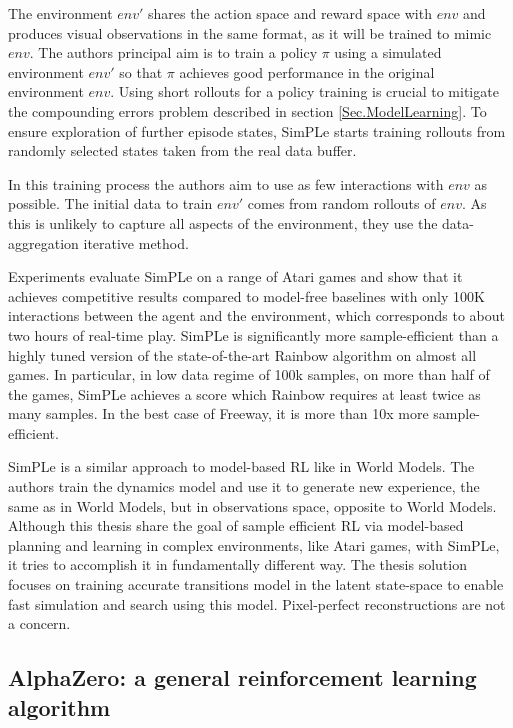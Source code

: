 The environment $env'$ shares the action space and reward space with $env$ and produces visual observations in the same format, as it will be trained to mimic $env$. The authors principal aim is to train a policy $\pi$ using a simulated environment $env'$ so that $\pi$ achieves good performance in the original environment $env$. Using short rollouts for a policy training is crucial to mitigate the compounding errors problem described in section \ref{Sec.ModelLearning}. To ensure exploration of further episode states, SimPLe starts training rollouts from randomly selected states taken from the real data buffer.

In this training process the authors aim to use as few interactions with $env$ as possible. The initial data to train $env'$ comes from random rollouts of $env$. As this is unlikely to capture all aspects of the environment, they use the data-aggregation iterative method.

Experiments evaluate SimPLe on a range of Atari games and show that it achieves competitive results compared to model-free baselines with only 100K interactions between the agent and the environment, which corresponds to about two hours of real-time play. SimPLe is significantly more sample-efficient than a highly tuned version of the state-of-the-art Rainbow algorithm \cite{Algo.Rainbow} on almost all games. In particular, in low data regime of 100k samples, on more than half of the games, SimPLe achieves a score which Rainbow requires at least twice as many samples. In the best case of Freeway, it is more than 10x more sample-efficient.

SimPLe is a similar approach to model-based RL like in World Models. The authors train the dynamics model and use it to generate new experience, the same as in World Models, but in observations space, opposite to World Models. \\
Although this thesis share the goal of sample efficient RL via model-based planning and learning in complex environments, like Atari games, with SimPLe, it tries to accomplish it in fundamentally different way. The thesis solution focuses on training accurate transitions model in the latent state-space to enable fast simulation and search using this model. Pixel-perfect reconstructions are not a concern.

\subsection{AlphaZero: a general reinforcement learning algorithm}

